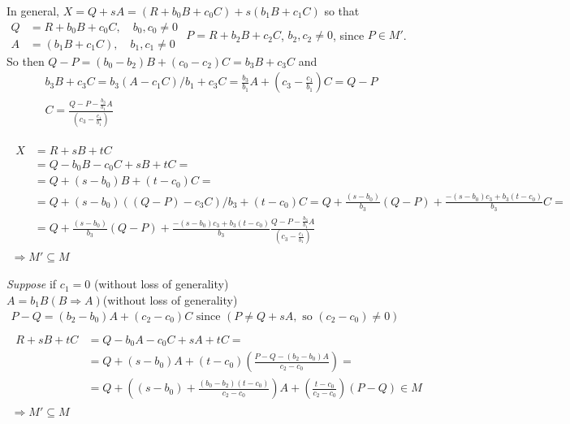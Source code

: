 \documentclass[twoside]{amsart}
\theoremstyle{plain}
\theoremstyle{definition}
\begin{document}
In general, $X = Q + sA = (R + b_0 B + c_0 C) + s(b_1 B + c_1 C)$ so that \medskip \\
$\begin{aligned}
  Q & = R + b_0 B + c_0 C, \quad b_0, c_0 \neq 0  \\
  A & = (b_1 B + c_1 C), \quad b_1,c_1 \neq 0
\end{aligned}$ \quad \quad $P = R + b_2 B + c_2 C$, $b_2,c_2 \neq 0$, since $P \in M'$.   \\
So then $Q - P = (b_0 - b_2)B + (c_0 - c_2)C = b_3 B + c_3 C$ and \\
\[
\begin{gathered}
  b_3 B + c_3 C = b_3 ( A - c_1 C)/b_1 + c_3 C = \frac{b_3}{b_1} A + (c_3 - \frac{c_1}{b_1} )C = Q- P \\
  C = \frac{ Q - P  - \frac{b_3}{b_1} A }{ (c_3 - \frac{c_1}{b_1} ) }
\end{gathered}
\]

\[
\begin{gathered}
  \begin{aligned}
    X & = R + sB + tC \\
    & = Q - b_0 B - c_0 C + sB + tC = \\
    & = Q + (s-b_0)B + (t-c_0)C = \\
    & = Q + (s-b_0)((Q-P) - c_3 C)/b_3 + (t-c_0)C = Q + \frac{ (s-b_0)}{b_3} (Q-P) + \frac{ -(s-b_0)c_3 + b_3(t-c_0) }{b_3} C = \\
    & = Q + \frac{ (s-b_0)}{b_3} (Q- P) + \frac{ -(s-b_0)c_3 + b_3 (t-c_0) }{b_3} \frac{ Q - P  - \frac{b_3}{b_1} A }{ (c_3 - \frac{c_1}{b_1} ) }
  \end{aligned} \\
  \Longrightarrow M' \subseteq M
\end{gathered}
\]

\emph{ Suppose } if $c_1 = 0$ (without loss of generality) \smallskip \\
$A = b_1 B (B \Longrightarrow A)$(without loss of generality) 
\[
\begin{gathered} 
  P - Q = (b_2 - b_0) A + (c_2 - c_0) C  \text{ since } ( P \neq Q + sA, \text{ so } (c_2 - c_0) \neq 0 ) \\ 
  \quad \\ 
  \begin{aligned}
    R + sB + tC & = Q - b_0 A - c_0 C + sA + tC = \\
    & = Q + (s-b_0)A + (t-c_0) \left( \frac{ P-Q - (b_2 - b_0) A }{ c_2 -c_0 } \right) = \\
    & = Q + \left( (s-b_0) + \frac{ (b_0 - b_2 )(t-c_0 ) }{ c_2 - c_0 } \right) A + \left( \frac{ t-c_0}{c_2 -c_0} \right)(P - Q ) \in M 
  \end{aligned} \\
  \Longrightarrow M' \subseteq M 
\end{gathered}
\]
\end{document}
